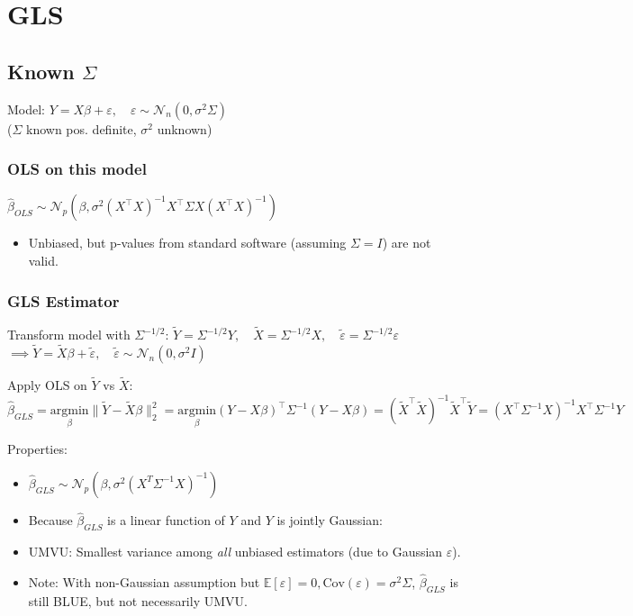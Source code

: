 
\section{GLS}
\subsection*{Known $\Sigma$}
Model: $Y = X\beta + \varepsilon, \quad \varepsilon \sim \mathcal{N}_n(0, \sigma^2 \Sigma)$
\\ {\tiny ($\Sigma$ known pos. definite, $\sigma^2$ unknown)}

\subsubsection*{OLS on this model}
$\hat{\beta}_{OLS} \sim \mathcal{N}_p(\beta, \sigma^2(X^\top X)^{-1} X^\top \Sigma X (X^\top X)^{-1})$
\begin{itemize}
    \item Unbiased, but p-values from standard software (assuming $\Sigma=I$) are not valid.
\end{itemize}

\subsubsection*{GLS Estimator}
Transform model with $\Sigma^{-1/2}$:
$\tilde{Y} = \Sigma^{-1/2}Y, \quad \tilde{X} = \Sigma^{-1/2}X, \quad \tilde{\varepsilon} = \Sigma^{-1/2}\varepsilon$
\\ $\implies \tilde{Y} = \tilde{X}\beta + \tilde{\varepsilon}, \quad \tilde{\varepsilon} \sim \mathcal{N}_n(0, \sigma^2 I)$

Apply OLS on $\tilde{Y}$ vs $\tilde{X}$:
$\hat{\beta}_{GLS} = \underset{\beta}{\text{argmin}} \|\tilde{Y} - \tilde{X}\beta\|_2^2 = \underset{\beta}{\text{argmin}} (Y - X\beta)^\top \Sigma^{-1} (Y - X\beta) = (\tilde{X}^\top \tilde{X})^{-1} \tilde{X}^\top \tilde{Y} = (X^\top \Sigma^{-1} X)^{-1} X^\top \Sigma^{-1} Y$

Properties:
\begin{itemize}
    \item $\hat{\beta}_{GLS} \sim \mathcal{N}_p\left( \beta, \sigma^2 (X^T \Sigma^{-1} X)^{-1} \right)$
    \item Because $\hat{\beta}_{GLS}$ is a linear function of $Y$ and $Y$ is jointly Gaussian:
    \item UMVU: Smallest variance among \textit{all} unbiased estimators (due to Gaussian $\varepsilon$).
    \item Note: With non-Gaussian assumption but $\mathbb{E}[\varepsilon]=0, \text{Cov}(\varepsilon)=\sigma^2\Sigma$, $\hat{\beta}_{GLS}$ is still BLUE, but not necessarily UMVU.
\end{itemize}

